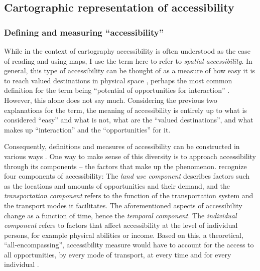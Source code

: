 



\subsection{Cartographic representation of accessibility}

\subsubsection{Defining and measuring \enquote{accessibility}}

While in the context of cartography accessibility is often understood as
the ease of reading and using maps,
I use the term here to refer to \textit{spatial accessibility}.
In general, this type of accessibility can be thought of as a measure of
how easy it is to reach valued destinations in physical space \parencite{lev2020},
perhaps the most common definition for the term being
\enquote{potential of opportunities for interaction} \parencite{han1959}.
However, this alone does not say much.
Considering the previous two explanations for the term,
the meaning of accessibility is entirely up to
what is considered \enquote{easy} and what is not,
what are the \enquote{valued destinations},
and what makes up \enquote{interaction} and the \enquote{opportunities} for it.

Consequently,
definitions and measures of accessibility can be constructed in various ways
\parencite{pap2016}.
One way to make sense of this diversity is to approach accessibility
through its components -- the factors that make up the phenomenon.
\textcite{geu2004} recognize four components of accessibility:
The \textit{land use component} describes factors
such as the locations and amounts of opportunities
and their demand,
and the \textit{transportation component} refers to
the function of the transportation system and the transport modes it facilitates.
The aforementioned aspects of accessibility change as a function of time,
hence the \textit{temporal component}.
The \textit{individual component} refers to
factors that affect accessibility at the level of individual persons,
for example physical abilities or income.
Based on this, a theoretical, \enquote{all-encompassing},
accessibility measure would have to account for
the access to all opportunities,
by every mode of transport,
at every time and for every individual \parencite{lev2020}.

